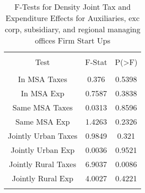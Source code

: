 
\begin{table}[!htbp] \centering 
  \caption{F-Tests for Density Joint Tax and Expenditure Effects for Auxiliaries, exc corp, subsidiary, and regional managing offices Firm Start Ups} 
  \label{95Ftests} 
\begin{tabular}{@{\extracolsep{5pt}} ccc} 
\\[-1.8ex]\hline 
\hline \\[-1.8ex] 
Test & F-Stat & P(\textgreater F) \\ 
\hline \\[-1.8ex] 
In MSA Taxes & 0.376 & 0.5398 \\ 
In MSA Exp & 0.7587 & 0.3838 \\ 
Same MSA Taxes & 0.0313 & 0.8596 \\ 
Same MSA Exp & 1.4263 & 0.2326 \\ 
Jointly Urban Taxes & 0.9849 & 0.321 \\ 
Jointly Urban Exp & 0.0036 & 0.9521 \\ 
Jointly Rural Taxes & 6.9037 & 0.0086 \\ 
Jointly Rural Exp & 4.0027 & 0.4221 \\ 
\hline \\[-1.8ex] 
\end{tabular} 
\end{table} 
